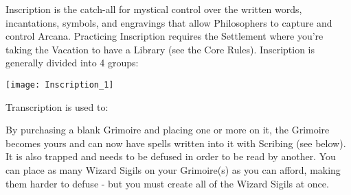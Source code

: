 {%




Inscription is the catch-all for mystical control over the written words, incantations, symbols, and engravings that allow Philosophers to capture and control Arcana.  Practicing Inscription requires the Settlement where you're taking the Vacation to have a Library (see the Core Rules). Inscription is generally divided into 4 groups:


  \begin{center}
  \texttt{[image: Inscription\_1]}
  \end{center}




Transcription is used to: 


By purchasing a blank Grimoire and placing one or more  on it, the Grimoire becomes yours and can now have spells written into it with Scribing (see below).  It is also trapped and needs to be defused in order to be read by another.   You can place as many Wizard Sigils on your Grimoire(s) as you can afford, making them harder to defuse - but you must create all of the Wizard Sigils at once.


}
